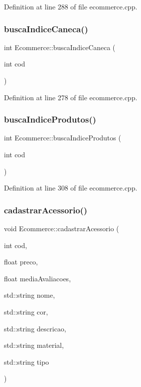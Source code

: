 Definition at line 288 of file ecommerce.\+cpp.

\mbox{\label{class_ecommerce_a7f148dfc9339dfd26b021185e431cd1f}} 
\subsubsection{\texorpdfstring{busca\+Indice\+Caneca()}{buscaIndiceCaneca()}}
{\footnotesize\ttfamily int Ecommerce\+::busca\+Indice\+Caneca (\begin{DoxyParamCaption}\item[{int}]{cod }\end{DoxyParamCaption})}



Definition at line 278 of file ecommerce.\+cpp.

\mbox{\label{class_ecommerce_af2d514aa14dbca0c0e06337efa7f668a}} 
\subsubsection{\texorpdfstring{busca\+Indice\+Produtos()}{buscaIndiceProdutos()}}
{\footnotesize\ttfamily int Ecommerce\+::busca\+Indice\+Produtos (\begin{DoxyParamCaption}\item[{int}]{cod }\end{DoxyParamCaption})}



Definition at line 308 of file ecommerce.\+cpp.

\mbox{\label{class_ecommerce_af37509f24042326e7a4d7ef3acc9b9ac}} 
\subsubsection{\texorpdfstring{cadastrar\+Acessorio()}{cadastrarAcessorio()}}
{\footnotesize\ttfamily void Ecommerce\+::cadastrar\+Acessorio (\begin{DoxyParamCaption}\item[{int}]{cod,  }\item[{float}]{preco,  }\item[{float}]{media\+Avaliacoes,  }\item[{std\+::string}]{nome,  }\item[{std\+::string}]{cor,  }\item[{std\+::string}]{descricao,  }\item[{std\+::string}]{material,  }\item[{std\+::string}]{tipo }\end{DoxyParamCaption})}



